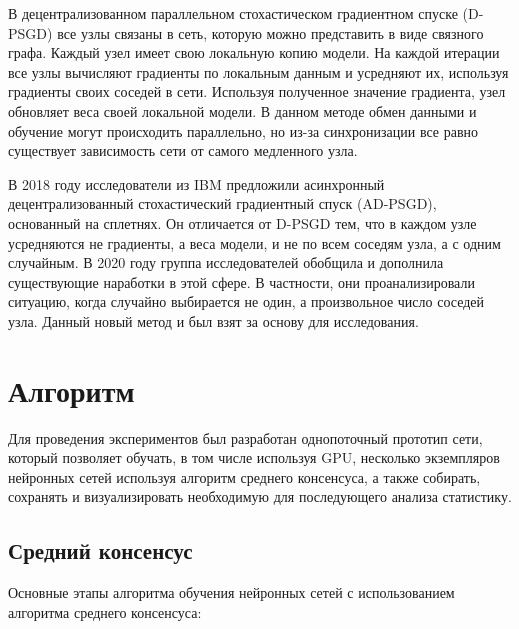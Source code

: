 \documentclass[a4paper,article,14pt]{extarticle}
\begin{document}
В децентрализованном параллельном стохастическом градиентном спуске (D-PSGD) \cite{o8, o9, o10} все узлы связаны в сеть, которую можно представить в виде связного графа. Каждый узел имеет свою локальную копию модели. На каждой итерации все узлы вычисляют градиенты по локальным данным и усредняют их, используя градиенты своих соседей в сети. Используя полученное значение градиента, узел обновляет веса своей локальной модели. В данном методе обмен данными и обучение могут происходить параллельно, но из-за синхронизации все равно существует зависимость сети от самого медленного узла.

В 2018 году исследователи из IBM предложили \cite{o11} асинхронный децентрализованный стохастический градиентный спуск (AD-PSGD), основанный на сплетнях. Он отличается от D-PSGD тем, что в каждом узле усредняются не градиенты, а веса модели, и не по всем соседям узла, а с одним случайным. В 2020 году группа исследователей \cite{decentralized_sgd} обобщила и дополнила существующие наработки в этой сфере. В частности, они проанализировали ситуацию, когда случайно выбирается не один, а произвольное число соседей узла. Данный новый метод и был взят за основу для исследования.


\pagebreak
\section{Алгоритм}
Для проведения экспериментов был разработан однопоточный прототип сети, который позволяет обучать, в том числе используя GPU, несколько экземпляров нейронных сетей используя алгоритм среднего консенсуса, а также собирать, сохранять и визуализировать необходимую для последующего анализа статистику.
\subsection{Средний консенсус}
Основные этапы алгоритма обучения нейронных сетей с использованием алгоритма среднего консенсуса:
\end{document}
